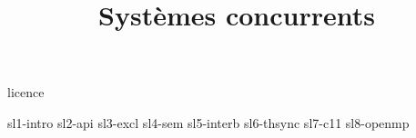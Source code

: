 \documentclass [xcolor=table] {beamer}
\title {Systèmes concurrents}
\begin{document}

 {licence}

 {sl1-intro}
 {sl2-api}
 {sl3-excl}
 {sl4-sem}
 {sl5-interb}
 {sl6-thsync}
 {sl7-c11}
 {sl8-openmp}
\end{document}
